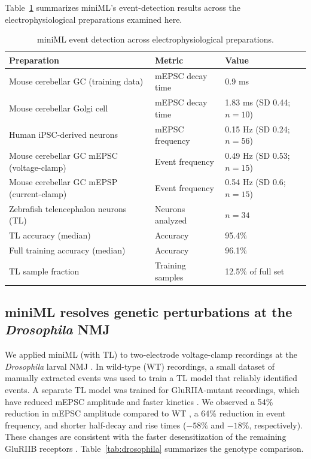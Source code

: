 \documentclass[9pt,lineno]{article}
\begin{document}
Table~\ref{tab:generalization} summarizes miniML's event-detection results across the electrophysiological preparations examined here.

\begin{table}[ht]
\centering
\caption{miniML event detection across electrophysiological preparations.}
\label{tab:generalization}
\begin{tabular}{lll}
\toprule
Preparation & Metric & Value \\
\midrule
Mouse cerebellar GC (training data) & mEPSC decay time & 0.9 ms \\
Mouse cerebellar Golgi cell & mEPSC decay time & 1.83 ms (SD 0.44; $n=10$) \\
Human iPSC-derived neurons & mEPSC frequency & 0.15 Hz (SD 0.24; $n=56$) \\
Mouse cerebellar GC mEPSC (voltage-clamp) & Event frequency & 0.49 Hz (SD 0.53; $n=15$) \\
Mouse cerebellar GC mEPSP (current-clamp) & Event frequency & 0.54 Hz (SD 0.6; $n=15$) \\
Zebrafish telencephalon neurons (TL) & Neurons analyzed & $n = 34$ \\
TL accuracy (median) & Accuracy & 95.4\% \\
Full training accuracy (median) & Accuracy & 96.1\% \\
TL sample fraction & Training samples & 12.5\% of full set \\
\bottomrule
\end{tabular}
\end{table}

\subsection{miniML resolves genetic perturbations at the \textit{Drosophila} NMJ}

We applied miniML (with TL) to two-electrode voltage-clamp recordings at the \textit{Drosophila} larval NMJ \citep{BaccinoCalace2022}. In wild-type (WT) recordings, a small dataset of manually extracted events was used to train a TL model that reliably identified events. A separate TL model was trained for GluRIIA-mutant recordings, which have reduced mEPSC amplitude and faster kinetics \citep{DiAntonio1999}. We observed a 54\% reduction in mEPSC amplitude compared to WT \citep{DiAntonio1999,Petersen1997}, a 64\% reduction in event frequency, and shorter half-decay and rise times ($-58\%$ and $-18\%$, respectively). These changes are consistent with the faster desensitization of the remaining GluRIIB receptors \citep{DiAntonio1999}. Table~\ref{tab:drosophila} summarizes the genotype comparison.
\end{document}
